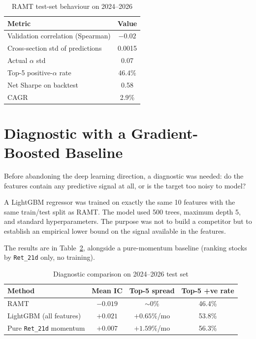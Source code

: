\documentclass[conference]{IEEEtran}
\begin{document}
\begin{table}[htbp]
\caption{RAMT test-set behaviour on 2024--2026}
\label{tab:ramt-results}
\centering
\begin{tabular}{lc}
\toprule
\textbf{Metric} & \textbf{Value} \\
\midrule
Validation correlation (Spearman) & $-0.02$ \\
Cross-section std of predictions & 0.0015 \\
Actual $\alpha$ std & 0.07 \\
Top-5 positive-$\alpha$ rate & 46.4\% \\
Net Sharpe on backtest & 0.58 \\
CAGR & 2.9\% \\
\bottomrule
\end{tabular}
\end{table}

\section{Diagnostic with a Gradient-Boosted Baseline}

Before abandoning the deep learning direction, a diagnostic was needed: do the features contain any predictive signal at all, or is the target too noisy to model?

A LightGBM regressor was trained on exactly the same 10 features with the same train/test split as RAMT. The model used 500 trees, maximum depth 5, and standard hyperparameters. The purpose was not to build a competitor but to establish an empirical lower bound on the signal available in the features.

The results are in Table~\ref{tab:diagnostic}, alongside a pure-momentum baseline (ranking stocks by \texttt{Ret\_21d} only, no training).

\begin{table}[htbp]
\caption{Diagnostic comparison on 2024--2026 test set}
\label{tab:diagnostic}
\centering
\begin{tabular}{lccc}
\toprule
\textbf{Method} & \textbf{Mean IC} & \textbf{Top-5 spread} & \textbf{Top-5 +ve rate} \\
\midrule
RAMT & $-0.019$ & $\sim$0\% & 46.4\% \\
LightGBM (all features) & $+0.021$ & $+0.65\%$/mo & 53.8\% \\
Pure \texttt{Ret\_21d} momentum & $+0.007$ & $+1.59\%$/mo & 56.3\% \\
\bottomrule
\end{tabular}
\end{table}
\end{document}
